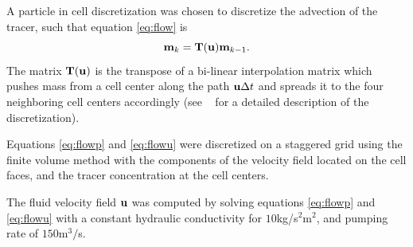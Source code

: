 \documentclass[11pt]{article}
\begin{document}
A particle in cell discretization \cite{Edwards2012} was chosen to discretize the advection of the tracer, such that equation \eqref{eq:flow} is
\begin{equation*}
{\bf{m}} _k= {\bf{T}}({\bf{u}}){\bf{m}}_{k-1}. 
\end{equation*}
The matrix ${\bf{T}}({\bf{u}})$ is the transpose of a bi-linear interpolation matrix which pushes mass from a cell center along the  path ${\bf{u}} \Delta t$ and spreads it to the four neighboring cell centers accordingly (see ~\cite{Fohring2014} for
a detailed description of the discretization). 

Equations \eqref{eq:flowp} and \eqref{eq:flowu}  were discretized on a staggered grid using the finite volume method with the components of the velocity field located on the cell faces, and the tracer concentration at the cell centers. 

%
%       
%      
%      
%

The  fluid velocity field ${\bf{u}}$ was  computed by solving equations \eqref{eq:flowp} and \eqref{eq:flowu} with a constant hydraulic conductivity for  $10$kg/s$^2$m$^2$, and pumping rate of $150$m$^3/$s. 
\end{document}
